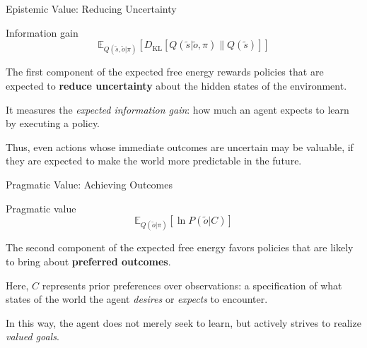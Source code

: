 \documentclass[aspectratio=1610, english]{beamer}
\begin{document}
\begin{frame}{Epistemic Value: Reducing Uncertainty}
    \begin{block}{Information gain}
        \begin{equation}
            \mathbb{E}_{Q(\tilde{s}, \tilde{o} | \pi)}[D_{\mathrm{KL}}[Q(\tilde{s}| \tilde{o}, \pi) \| Q(\tilde{s})]]
        \end{equation}
    \end{block}

    The first component of the expected free energy rewards policies that are expected to \textbf{reduce uncertainty} about the hidden states of the environment.

    \vspace{0.3cm}

    It measures the \emph{expected information gain}: how much an agent expects to learn by executing a policy.

    \vspace{0.3cm}

    Thus, even actions whose immediate outcomes are uncertain may be valuable, if they are expected to make the world more predictable in the future.

\end{frame}

\begin{frame}{Pragmatic Value: Achieving Outcomes}
    \begin{block}{Pragmatic value}
        \begin{equation}
            \mathbb{E}_{Q(\tilde{o}|\pi)}[\ln P(\tilde{o}|C)]
        \end{equation}
    \end{block}

    The second component of the expected free energy favors policies that are likely to bring about \textbf{preferred outcomes}.

    \vspace{0.3cm}

    Here, \(C\) represents prior preferences over observations:  
    a specification of what states of the world the agent \emph{desires} or \emph{expects} to encounter.

    \vspace{0.3cm}

    In this way, the agent does not merely seek to learn, but actively strives to realize \emph{valued goals}.
\end{frame}
\end{document}
